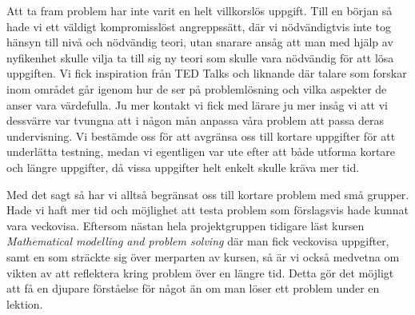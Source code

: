 \textcolor{Mahogany}{Att ta fram problem har inte varit en helt villkorslös uppgift. Till en början så hade vi ett väldigt kompromisslöst angreppssätt, där vi nödvändigtvis inte tog hänsyn till nivå och nödvändig teori, utan snarare ansåg att man med hjälp av nyfikenhet skulle vilja ta till sig ny teori som skulle vara nödvändig för att lösa uppgiften. Vi fick inspiration från TED Talks och liknande där talare som forskar inom området går igenom hur de ser på problemlösning och vilka aspekter de anser vara värdefulla. Ju mer kontakt vi fick med lärare ju mer insåg vi att vi dessvärre var tvungna att i någon mån anpassa våra problem att passa deras undervisning. Vi bestämde oss för att avgränsa oss till kortare uppgifter för att underlätta testning, medan vi egentligen var ute efter att både utforma kortare och längre uppgifter, då vissa uppgifter helt enkelt skulle kräva mer tid.}

\textcolor{Mahogany}{Med det sagt så har vi alltså begränsat oss till kortare problem med små grupper. Hade vi haft mer tid och möjlighet att testa problem som förslagsvis hade kunnat vara veckovisa. Eftersom nästan hela projektgruppen tidigare läst kursen \textsl{Mathematical modelling and problem solving}\cite{matmod} där man fick veckovisa uppgifter, samt en som sträckte sig över merparten av kursen, så är vi också medvetna om vikten av att reflektera kring problem över en längre tid. Detta gör det möjligt att få en djupare förståelse för något än om man löser ett problem under en lektion.}